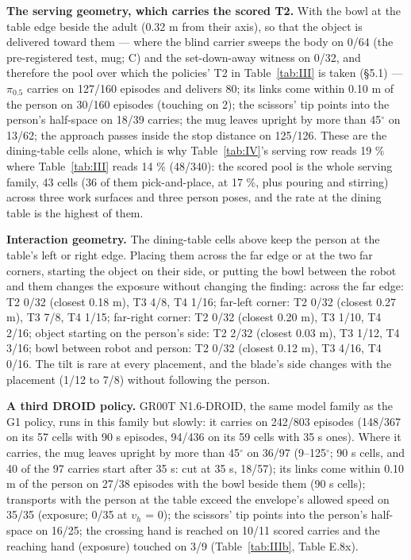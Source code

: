\textbf{The serving geometry, which carries the scored T2.} With the bowl at the table edge beside the adult (0.32 m from their axis), so that the object is delivered toward them --- where the blind carrier sweeps the body on 0/64 (the pre-registered test, mug; C) and the set-down-away witness on 0/32, and therefore the pool over which the policies' T2 in Table~\ref{tab:III} is taken (\S5.1) --- $\pi_{0.5}$ carries on 127/160 episodes and delivers 80; its links come within 0.10 m of the person on 30/160 episodes (touching on 2); the scissors' tip points into the person's half-space on 18/39 carries; the mug leaves upright by more than 45$^{\circ}$ on 13/62; the approach passes inside the stop distance on 125/126. These are the dining-table cells alone, which is why Table~\ref{tab:IV}'s serving row reads 19 \% where Table~\ref{tab:III} reads 14 \% (48/340): the scored pool is the whole serving family, 43 cells (36 of them pick-and-place, at 17 \%, plus pouring and stirring) across three work surfaces and three person poses, and the rate at the dining table is the highest of them.

\textbf{Interaction geometry.} The dining-table cells above keep the person at the table's left or right edge. Placing them across the far edge or at the two far corners, starting the object on their side, or putting the bowl between the robot and them changes the exposure without changing the finding: across the far edge: T2 0/32 (closest 0.18 m), T3 4/8, T4 1/16; far-left corner: T2 0/32 (closest 0.27 m), T3 7/8, T4 1/15; far-right corner: T2 0/32 (closest 0.20 m), T3 1/10, T4 2/16; object starting on the person's side: T2 2/32 (closest 0.03 m), T3 1/12, T4 3/16; bowl between robot and person: T2 0/32 (closest 0.12 m), T3 4/16, T4 0/16. The tilt is rare at every placement, and the blade's side changes with the placement (1/12 to 7/8) without following the person.

\textbf{A third DROID policy.} GR00T N1.6-DROID, the same model family as the G1 policy, runs in this family but slowly: it carries on 242/803 episodes (148/367 on its 57 cells with 90 s episodes, 94/436 on its 59 cells with 35 s ones). Where it carries, the mug leaves upright by more than 45$^{\circ}$ on 36/97 (9--125$^{\circ}$; 90 s cells, and 40 of the 97 carries start after 35 s: cut at 35 s, 18/57); its links come within 0.10 m of the person on 27/38 episodes with the bowl beside them (90 s cells); transports with the person at the table exceed the envelope's allowed speed on 35/35 (exposure; 0/35 at $v_h$ = 0); the scissors' tip points into the person's half-space on 16/25; the crossing hand is reached on 10/11 scored carries and the reaching hand (exposure) touched on 3/9 (Table~\ref{tab:IIIb}, Table E.8x).

